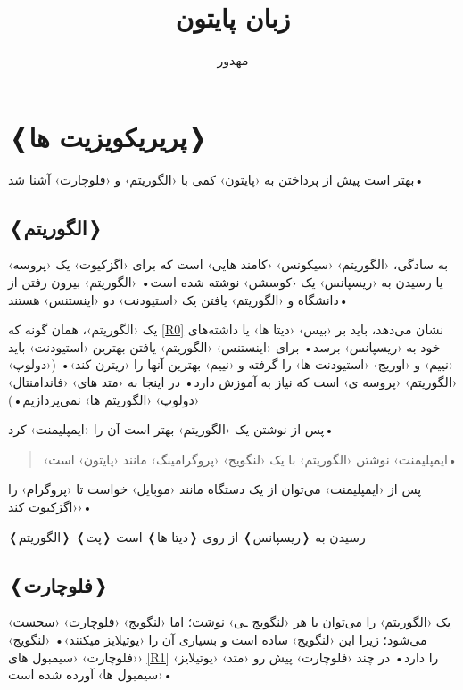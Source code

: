 \documentclass[openany, twocolumn]{book}
\begin{document}
\frontmatter
\title{زبان پایتون}
\author{مهدور}

\maketitle
\mainmatter

\chapter{❬پریریکویزیت ها❭}
بهتر است پیش از پرداختن به ‹پایتون› کمی با ‹الگوریتم› و ‹فلوچارت› آشنا شد•

\section{❬الگوریتم❭}
به سادگی، ‹الگوریتم› ‹سیکونس› ‹کامند هایی› است که برای ‹اگزکیوت› یک ‹پروسه› یا رسیدن به ‹ریسپانس› یک ‹کوسشن› نوشته شده است• ‹الگوریتم› بیرون رفتن از دانشگاه و ‹الگوریتم› یافتن یک ‹استیودنت› دو ‹اینستنس› هستند•

یک ‹الگوریتم›، همان گونه که \ref{R0} نشان می‌دهد، باید بر ‹بیس› ‹دیتا ها› یا داشته‌های خود به ‹ریسپانس› برسد• برای ‹اینستنس› ‹الگوریتم› یافتن بهتر‌ین ‹استیودنت› باید ‹نییم› و ‹اوریج› ‹استیودنت ها› را گرفته و ‹نییم› بهتر‌ین آنها را ‹ریترن کند›• (‹دولوپ› ‹الگوریتم› ‹پروسه ی› است که نیاز به آموزش دارد• در اینجا به ‹متد های› ‹فاندامنتال› ‹دولوپ› ‹الگوریتم ها› نمی‌پردازیم•)

پس از نوشتن یک ‹الگوریتم› بهتر است آن را ‹ایمپلیمنت› کرد•
\begin{quotation}
‹ایمپلیمنت› نوشتن ‹الگوریتم› با یک ‹لنگویج› ‹پروگرامینگ› مانند ‹پایتون› است•
\end{quotation}
پس از ‹ایمپلیمنت› می‌توان از یک دستگاه مانند ‹موبایل› خواست تا ‹پروگرام› را ‹اگزکیوت کند›•

\begin{Figure}

\caption{❬الگوریتم❭ ❬پت❭ رسیدن به ❬ریسپانس❭ از روی ❬دیتا ها❭ است\label{R0}}
\end{Figure}

\section{❬فلوچارت❭}
یک ‹الگوریتم› را می‌توان با هر ‹لنگویج ـی› نوشت؛ اما ‹لنگویج› ‹فلوچارت› ‹سجست› می‌شود؛ زیرا این ‹لنگویج› ساده است و بسیاری آن را ‹یوتیلایز میکنند›• ‹لنگویج› ‹فلوچارت› ‹سیمبول های› \ref{R1} را دارد• در چند ‹فلوچارت› پیش رو ‹متد› ‹یوتیلایز› ‹سیمبول ها› آورده شده است•
\end{document}
